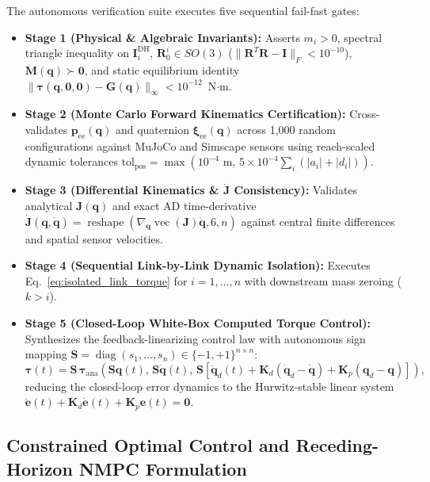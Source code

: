 \documentclass[fleqn,10pt]{article}
\begin{document}
	The autonomous verification suite executes five sequential fail-fast gates:
	\begin{itemize}
		\item \textbf{Stage 1 (Physical \& Algebraic Invariants):} Asserts $m_i > 0$, spectral triangle inequality on $\bm{I}_i^{\text{DH}}$, $\bm{R}_0^i \in SO(3)$ ($\|\bm{R}^T\bm{R} - \bm{I}\|_F < 10^{-10}$), $\bm{M}(\bm{q}) \succ \bm{0}$, and static equilibrium identity $\|\bm{\tau}(\bm{q},\bm{0},\bm{0}) - \bm{G}(\bm{q})\|_\infty < 10^{-12}$~N$\cdot$m.
		\item \textbf{Stage 2 (Monte Carlo Forward Kinematics Certification):} Cross-validates $\bm{p}_{\text{ee}}(\bm{q})$ and quaternion $\bm{\xi}_{\text{ee}}(\bm{q})$ across 1,000 random configurations against MuJoCo and Simscape sensors using reach-scaled dynamic tolerances $\text{tol}_{\text{pos}} = \max(10^{-4}\text{ m}, \, 5 \times 10^{-4} \sum_i (|a_i|+|d_i|))$.
		\item \textbf{Stage 3 (Differential Kinematics \& $\dot{\bm{J}}$ Consistency):} Validates analytical $\bm{J}(\bm{q})$ and exact AD time-derivative $\dot{\bm{J}}(\bm{q},\dot{\bm{q}}) = \operatorname{reshape}(\nabla_{\bm{q}}\operatorname{vec}(\bm{J})\dot{\bm{q}}, 6, n)$ against central finite differences and spatial sensor velocities.
		\item \textbf{Stage 4 (Sequential Link-by-Link Dynamic Isolation):} Executes Eq.~\eqref{eq:isolated_link_torque} for $i = 1, \dots, n$ with downstream mass zeroing ($k > i$).
		\item \textbf{Stage 5 (Closed-Loop White-Box Computed Torque Control):} Synthesizes the feedback-linearizing control law with autonomous sign mapping $\bm{S} = \operatorname{diag}(s_1, \dots, s_n) \in \{-1, +1\}^{n \times n}$:
		\begin{equation}
			\bm{\tau}(t) = \bm{S} \, \bm{\tau}_{\text{ana}}\!\left( \bm{S}\bm{q}(t), \, \bm{S}\dot{\bm{q}}(t), \, \bm{S}\left[\ddot{\bm{q}}_d(t) + \bm{K}_d(\dot{\bm{q}}_d - \dot{\bm{q}}) + \bm{K}_p(\bm{q}_d - \bm{q})\right] \right),
			\label{eq:ctc_law}
		\end{equation}
		reducing the closed-loop error dynamics to the Hurwitz-stable linear system $\ddot{\bm{e}}(t) + \bm{K}_d\dot{\bm{e}}(t) + \bm{K}_p\bm{e}(t) = \bm{0}$.
	\end{itemize}
	
	\subsection*{Constrained Optimal Control and Receding-Horizon NMPC Formulation}
	
\end{document}

